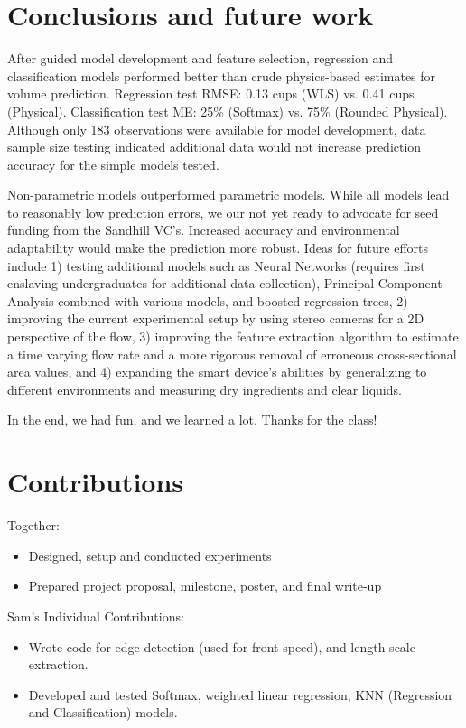 \documentclass[twocolumn,10pt]{article}
\begin{document}
\section{Conclusions and future work}
After guided model development and feature selection, regression and classification models performed better than crude physics-based estimates for volume prediction. Regression test RMSE:  0.13 cups (WLS) vs. 0.41 cups (Physical). Classification test ME: 25\% (Softmax) vs. 75\% (Rounded Physical). Although only 183 observations were available for model development, data sample size testing indicated additional data would not increase prediction accuracy for the simple models tested.

Non-parametric models outperformed parametric models. While all models lead to reasonably low prediction errors, we our not yet ready to advocate for seed funding from the Sandhill VC's. Increased accuracy and environmental adaptability would make the prediction more robust. Ideas for future efforts include 1) testing additional models such as Neural Networks (requires first enslaving undergraduates for additional data collection), Principal Component Analysis combined with various models, and boosted regression trees, 2) improving the current experimental setup by using stereo cameras for a 2D perspective of the flow, 3) improving the feature extraction algorithm to estimate a time varying flow rate and a more rigorous removal of erroneous cross-sectional area values, and 4) expanding the smart device's abilities by generalizing to different environments and measuring dry ingredients and clear liquids.
  
In the end, we had fun, and we learned a lot. Thanks for the class!
  
  
\section{Contributions}
Together:
\begin{itemize}
\item Designed, setup and conducted experiments 
\item Prepared project proposal, milestone, poster, and final write-up
\end{itemize}

Sam's Individual Contributions:
\begin{itemize}
\item Wrote code for edge detection (used for front speed), and length scale extraction.
\item Developed and tested Softmax, weighted linear regression, KNN (Regression and Classification) models. 
\end{itemize}
\end{document}
